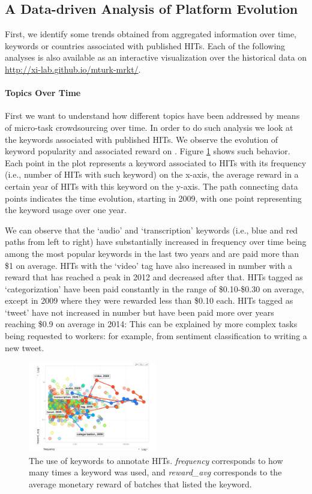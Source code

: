 \subsection{A Data-driven Analysis of Platform Evolution}
First, we identify some trends obtained from aggregated information over time, keywords or countries associated with published HITs.  Each of the following analyses is also available as an interactive visualization over the historical data on \url{http://xi-lab.github.io/mturk-mrkt/}.
\paragraph{Topics  Over Time}
First we want to understand how different topics have been addressed by means of micro-task crowdsourcing over time.
In order to do such analysis we look at the keywords associated with published HITs. We observe the evolution of keyword popularity and associated reward on \amt{}. 
Figure \ref{fig:tagEvolution} shows such behavior. Each point in the plot represents a keyword associated to HITs with its frequency (i.e., number of HITs with such keyword) on the x-axis, the average reward in a certain year of HITs with this keyword on the y-axis. The path connecting data points indicates the time evolution, starting in 2009, with one point representing the keyword usage over one year.

We can observe that the `audio' and `transcription' keywords (i.e., blue and red paths from left to right) have substantially increased in frequency over time being among the most popular keywords in the last two years and are paid more than \$1 on average.
HITs with the `video' tag have also increased in number with a reward that has reached a peak in 2012 and decreased after that.
HITs tagged as `categorization' have been paid constantly in the range of \$0.10-\$0.30 on average, except in 2009 where they were rewarded less than \$0.10 each.
HITs tagged as `tweet' have not increased in number but have been paid more over years reaching \$0.9 on average in 2014: This can be explained by more complex tasks being requested to workers: for example, from sentiment classification to writing a new tweet.

\begin{figure}[tb]
	\centering
		\includegraphics[width=0.5\textwidth]{figures/tagEvolution}
	\caption{The use of keywords to annotate HITs. \emph{frequency} corresponds to how many times a keyword was used, and \emph{reward\_avg} corresponds to the average monetary reward of batches that listed the keyword.}
	\label{fig:tagEvolution}
\end{figure}

